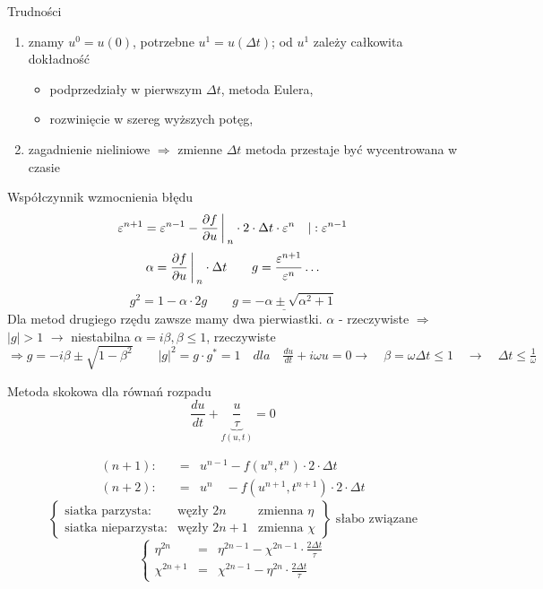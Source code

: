 \begin{frame}{Trudności}
	\begin{enumerate}
      \item znamy $u^0 = u(0)$, potrzebne $u^1 = u(\Delta t)$; od $u^1$ zależy całkowita dokładność
          \begin{itemize}
            \item podprzedziały w pierwszym $\Delta t$, metoda Eulera,
            \item rozwinięcie w szereg wyższych potęg,
          \end{itemize}
      \item zagadnienie nieliniowe $\Rightarrow$ zmienne $\Delta t$ \quad metoda przestaje być wycentrowana w czasie
    \end{enumerate}
\end{frame}
\begin{frame}{Współczynnik wzmocnienia błędu}
	$$\varepsilon^{n+1} = \varepsilon^{n-1} - \frac{\partial f}{\partial u} \bigg\arrowvert _n \cdot 2 \cdot \Delta t \cdot \varepsilon^n \quad \arrowvert :\varepsilon^{n-1}$$
    $$\alpha = \frac{\partial f}{\partial u}\bigg\arrowvert_n \cdot \Delta t \qquad g = \frac{\varepsilon^{n+1}}{\varepsilon^n} \ldots$$
    $$g^2 = 1- \alpha \cdot 2g \qquad \underline{g = -\alpha \pm \sqrt{\alpha^2+1}}$$
    Dla metod drugiego rzędu zawsze mamy dwa pierwiastki. \newline
    $\alpha$ - rzeczywiste $\Rightarrow$ \quad $|g| > 1$ \quad $\rightarrow$ niestabilna \quad $\alpha = i\beta, \beta \leqslant 1$, rzeczywiste \newline
    $\Rightarrow g = -i\beta\pm\sqrt{1-\beta^2} \qquad |g|^2 = g \cdot g^* = 1 \quad dla \quad \frac{du}{dt}+i\omega u = 0 \rightarrow \quad \beta = \omega\Delta t \leqslant 1 \quad \rightarrow \quad \Delta t \leqslant\frac{1}{\omega}$
\end{frame}
\begin{frame}{Metoda skokowa dla równań rozpadu}
	$$\frac{du}{dt}+\underbrace{\frac{u}{\tau}}_{f(u,t)} = 0$$\par
    $$ \begin{array}{rcl}
      (n+1):\quad &=&u^{n-1} -f(u^n,t^n)\cdot 2 \cdot \Delta t\\
      (n+2):\quad &=&u^n \quad -f(u^{n+1},t^{n+1})\cdot 2 \cdot \Delta t
      \end{array} $$
      $$\left\{\begin{array}{lll}
      \text{siatka parzysta:}& \text{węzły } 2n&\text{zmienna } \eta\\
      \text{siatka nieparzysta:}&\text{węzły } 2n+1& \text{zmienna }\chi
      \end{array}\right\}\text{  słabo związane}$$
      $$\left\{\begin{array}{lcl}
      \eta^{2n} &=& \eta^{2n-1} - \chi^{2n-1} \cdot\frac{2\Delta t}{\tau}\\
      \chi^{2n+1} &=& \chi^{2n-1} - \eta^{2n} \cdot\frac{2\Delta t}{\tau}
    \end{array}\right.$$
\end{frame}
